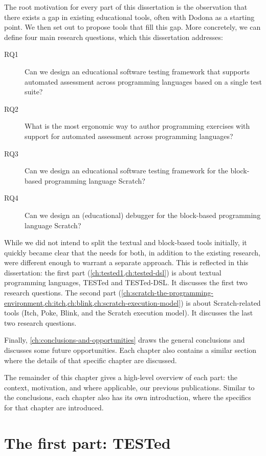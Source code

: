 \documentclass[../main]{subfiles}
\begin{document}
The root motivation for every part of this dissertation is the observation that there exists a gap in existing educational tools, often with Dodona as a starting point.
We then set out to propose tools that fill this gap.
More concretely, we can define four main research questions, which this dissertation addresses:

\begin{description}
    \item[RQ1] Can we design an educational software testing framework that supports automated assessment across programming languages based on a single test suite?
    \item[RQ2] What is the most ergonomic way to author programming exercises with support for automated assessment across programming languages?
    \item[RQ3] Can we design an educational software testing framework for the block-based programming language Scratch?
    \item[RQ4] Can we design an (educational) debugger for the block-based programming language Scratch?
\end{description}

While we did not intend to split the textual and block-based tools initially, it quickly became clear that the needs for both, in addition to the existing research, were different enough to warrant a separate approach.
This is reflected in this dissertation: the first part (\cref{ch:tested1,ch:tested-dsl}) is about textual programming languages, TESTed and TESTed-DSL\@.
It discusses the first two research questions.
The second part (\cref{ch:scratch-the-programming-environment,ch:itch,ch:blink,ch:scratch-execution-model}) is about Scratch-related tools (Itch, Poke, Blink, and the Scratch execution model).
It discusses the last two research questions.

Finally, \cref{ch:conclusions-and-opportunities} draws the general conclusions and discusses some future opportunities.
Each chapter also contains a similar section where the details of that specific chapter are discussed.

The remainder of this chapter gives a high-level overview of each part: the context, motivation, and where applicable, our previous publications.
Similar to the conclusions, each chapter also has its own introduction, where the specifics for that chapter are introduced.

\section{The first part: TESTed}\label{sec:intro-tested}
\end{document}
